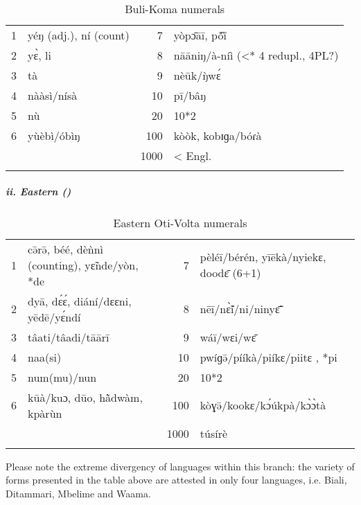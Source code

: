 \begin{table}
\caption{\label{tab:3:166}Buli-Koma numerals}


\begin{tabularx}{\textwidth}{lXrX}
\lsptoprule

{1} & yéŋ (adj.), ní (count) & {7} & yòp{\={ɔ}}{\={a}}{\={i}}, p{\'{\~o}}{\`ĩ}\\
{2} & y{\`{ɛ}}, li & {8} & n{\={a}}{\={a}}niŋ/à-níì (<* 4 redupl., 4PL?)\\
{3} & tà & {9} & nè{\={u}}k/{\`{ŋ}}w{\'{ɛ}}\\
{4} & nààsì/nísà & {10} & p{\={i}}/b{\^{a}}ŋ\\
{5} & n{\`{u}} & {20} & 10*2\\
{6} & y{\`{u}}èbì/óbìŋ & {100} & kòòk, kobɪɡa/bóɾà\\
&  & {1000} & < Engl.\\
\lspbottomrule
\end{tabularx}
\end{table}

  
\subparagraph{ii. Eastern ()}

\begin{table}
\caption{\label{tab:3:167}Eastern Oti-Volta numerals}


\begin{tabularx}{\textwidth}{lQrQ}
\lsptoprule

{1} & c{\={ə}}r{\={ə}}, béé, dè{\`{n}}nì (counting), y{\~{ɛ}}nde/yòn, *de & {7} & pèlé{\={i}}/bérén, y{\={i}}{\={e}}kà/nyiekɛ, dood{\={ɛ}} (6+1)\\
{2} & dy{\={a}}, d{\'{ɛ}}{\'{ɛ}}, diání/dɛɛni, y{\={e}}d{\={e}}/y{\'{ɛ}}ndí & {8} & n{\={e}}{\={i}}/n{\`{\~ɛ}}í/ni/niny{\={\~{ɛ}}}\\
{3} & t{\^{a}}ati/t{\^{a}}adi/t{\={a}}{\={a}}r{\={i}} & {9} & wá{\={i}}/wɛi/w{\={ɛ}}\\
{4} & naa(si) & {10} & pwíɡ{\={ə}}/pííkà/piíkɛ/piitɛ , *pi\\
{5} & num(mu)/nun & {20} & 10*2\\
{6} & k{\={u}}à/kuɔ, d{\={u}}o, h{\`{\~a}}dwàm, kpàr{\`{u}}n & {100} & kòɣ{\={ə}}/kookɛ/k{\'{ɔ}}{\'{u}}kpà/k{\`{ɔ}}{\`{ɔ}}tà\\
&  & {1000} & t{\'{u}}sírè\\
\lspbottomrule
\end{tabularx}
\end{table}

Please note the extreme divergency of languages within this branch: the variety of forms presented in the table above are attested in only four languages, i.e. Biali, Ditammari, Mbelime and Waama.

